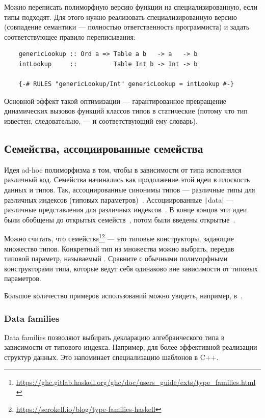 Можно переписать полиморфную версию функции на специализированную, если типы подходят.
Для этого нужно реализовать специализированную версию (совпадение семантики --- полностью ответственность программиста) и задать соответствующее правило переписывания:
\begin{verbatim}
    genericLookup :: Ord a => Table a b   -> a   -> b
    intLookup     ::          Table Int b -> Int -> b

    {-# RULES "genericLookup/Int" genericLookup = intLookup #-}
\end{verbatim}

Основной эффект такой оптимизации --- гарантированное превращение динамических вызовов функций классов типов в статические (потому что тип известен, следовательно, --- и соответствующий ему словарь).

\subsection{Семейства, ассоциированные семейства}

Идея ad-hoc полиморфизма в том, чтобы в зависимости от типа исполнялся различный код.
Семейства начинались как продолжение этой идеи в плоскость данных и типов.
Так, ассоциированные синонимы типов --- различные типы для различных индексов (типовых параметров)~\cite{chakravarty2005associated-syn}.
Ассоциированные \texttt|data| --- различные представления для различных индексов~\cite{chakravarty2005associated}.
В конце концов эти идеи были обобщены до открытых семейств~\cite{schrijvers2008type}, потом были введены открытые~\cite{eisenberg2014closed}.

Можно считать, что семейства\footnote{\url{https://ghc.gitlab.haskell.org/ghc/doc/users_guide/exts/type_families.html}}\footnote{\url{https://serokell.io/blog/type-families-haskell}} --- это типовые конструкторы, задающие множество типов.
Конкретный тип из множества можно выбрать, передав типовой параметр, называемый .
Сравните с обычными полиморфными конструкторами типа, которые ведут себя одинаково вне зависимости от типовых параметров.

Большое количество примеров использований можно увидеть, например, в~\cite{kiselyov2010fun}.

\subsubsection{Data families}

Data families позволяют выбирать декларацию алгебраического типа в зависимости от типового индекса.
Например, для более эффективной реализации структур данных.
Это напоминает специализацию шаблонов в C++.

